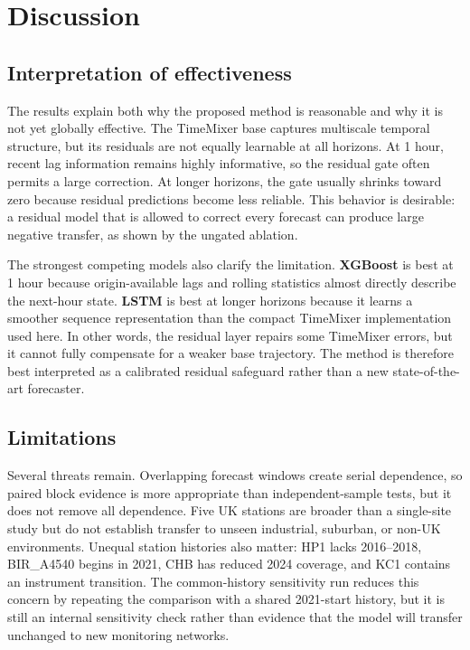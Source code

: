 \documentclass[sn-mathphys-num]{sn-jnl}
\begin{document}
\section{Discussion}
\label{sec:discussion}



\subsection{Interpretation of effectiveness}
\label{sec:discussion-interpretation}

The results explain both why the proposed method is reasonable and why it is
not yet globally effective. The TimeMixer base captures multiscale temporal
structure, but its residuals are not equally learnable at all horizons. At 1
hour, recent lag information remains highly informative, so the residual gate
often permits a large correction. At longer horizons, the gate usually shrinks
toward zero because residual predictions become less reliable. This behavior
is desirable: a residual model that is allowed to correct every forecast can
produce large negative transfer, as shown by the ungated ablation.

The strongest competing models also clarify the limitation. \textbf{XGBoost}
is best at 1 hour because origin-available lags and rolling statistics almost
directly describe the next-hour state. \textbf{LSTM} is best at longer
horizons because it learns a smoother sequence representation than the compact
TimeMixer implementation used here. In other words, the residual layer repairs
some TimeMixer errors, but it cannot fully compensate for a weaker base
trajectory. The method is therefore best interpreted as a calibrated residual
safeguard rather than a new state-of-the-art forecaster.

\subsection{Limitations}
\label{sec:discussion-limitations}

Several threats remain. Overlapping forecast windows create serial dependence,
so paired block evidence is more appropriate than independent-sample tests,
but it does not remove all dependence. Five UK stations are broader than a
single-site study but do not establish transfer to unseen industrial,
suburban, or non-UK environments. Unequal station histories also matter: HP1
lacks 2016--2018, BIR\_A4540 begins in 2021, CHB has reduced 2024 coverage,
and KC1 contains an instrument transition. The common-history sensitivity run
reduces this concern by repeating the comparison with a shared 2021-start
history, but it is still an internal sensitivity check rather than evidence
that the model will transfer unchanged to new monitoring networks.
\end{document}
